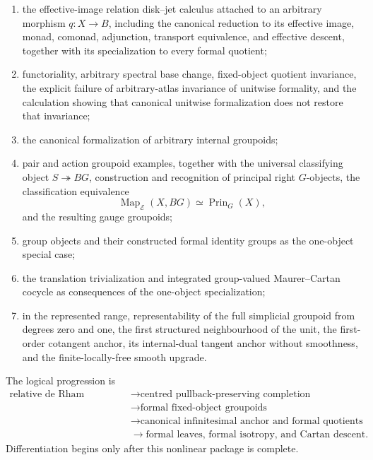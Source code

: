 \begin{enumerate}
    \item the effective-image relation disk--jet calculus attached to an
    arbitrary morphism $q:X\to B$, including the canonical reduction to its
    effective image, monad, comonad, adjunction, transport equivalence, and
    effective descent, together with its specialization to every formal
    quotient;
    \item functoriality, arbitrary spectral base change, fixed-object
    quotient invariance, the explicit failure of arbitrary-atlas invariance
    of unitwise formality, and the calculation showing that canonical
    unitwise formalization does not restore that invariance;
    \item the canonical formalization of arbitrary internal groupoids;
    \item pair and action groupoid examples, together with the universal
    classifying object $S\twoheadrightarrow BG$, construction and recognition
    of principal right $G$-objects, the classification equivalence
    \[
        \operatorname{Map}_{\mathcal E}(X,BG)
        \simeq
        \operatorname{Prin}_G(X),
    \]
    and the resulting gauge groupoids;
    \item group objects and their constructed formal identity groups as the
    one-object special case;
    \item the translation trivialization and integrated group-valued
    Maurer--Cartan cocycle as consequences of the one-object specialization;
    \item in the represented range, representability of the full simplicial
    groupoid from degrees zero and one, the first structured neighbourhood
    of the unit, the first-order cotangent anchor, its internal-dual tangent
    anchor without smoothness, and the finite-locally-free smooth upgrade.
\end{enumerate}

The logical progression is
\[
\boxed{
\begin{aligned}
\text{relative de Rham geometry}
&\longrightarrow
\text{centred pullback-preserving completion}
\\
&\longrightarrow
\text{formal fixed-object groupoids}
\\
&\longrightarrow
\text{canonical infinitesimal anchor and formal quotients}
\\
&\longrightarrow
\text{formal leaves, formal isotropy, and Cartan descent}.
\end{aligned}}
\]
Differentiation begins only after this nonlinear package is complete.

